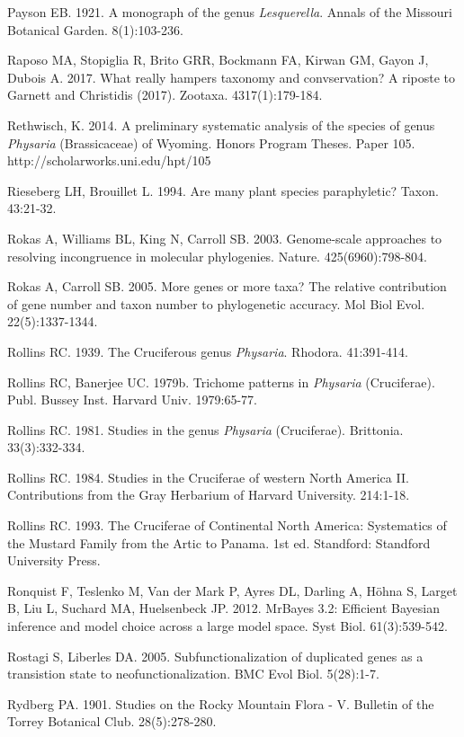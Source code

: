 Payson EB. 1921. A monograph of the genus \textit{Lesquerella}. Annals of the Missouri Botanical Garden. 8(1):103-236.

Raposo MA, Stopiglia R, Brito GRR, Bockmann FA, Kirwan GM, Gayon J, Dubois A. 2017. What really hampers taxonomy and convservation? A riposte to Garnett and Christidis (2017). Zootaxa. 4317(1):179-184.

Rethwisch, K. 2014. A preliminary systematic analysis of the species of genus \textit{Physaria} (Brassicaceae) of Wyoming. Honors Program Theses. Paper 105.
http://scholarworks.uni.edu/hpt/105

Rieseberg LH, Brouillet L. 1994. Are many plant species paraphyletic? Taxon. 43:21-32.

Rokas A, Williams BL, King N, Carroll SB. 2003. Genome-scale approaches to resolving incongruence in molecular phylogenies. Nature. 425(6960):798-804.

Rokas A, Carroll SB. 2005. More genes or more taxa? The relative contribution of gene number and taxon number to phylogenetic accuracy. Mol Biol Evol. 22(5):1337-1344.

Rollins RC. 1939. The Cruciferous genus \textit{Physaria}. Rhodora. 41:391-414.

Rollins RC, Banerjee UC. 1979b. Trichome patterns in \textit{Physaria} (Cruciferae). Publ. Bussey Inst. Harvard Univ. 1979:65-77.

Rollins RC. 1981. Studies in the genus \textit{Physaria} (Cruciferae). Brittonia. 33(3):332-334.

Rollins RC. 1984. Studies in the Cruciferae of western North America II. Contributions from the Gray Herbarium of Harvard University. 214:1-18.

Rollins RC. 1993. The Cruciferae of Continental North America: Systematics of the Mustard Family from the Artic to Panama. 1st ed. Standford: Standford University Press.

Ronquist F, Teslenko M, Van der Mark P, Ayres DL, Darling A, Höhna S, Larget B, Liu L, Suchard MA, Huelsenbeck JP. 2012. MrBayes 3.2: Efficient Bayesian inference and model choice across a large model space. Syst Biol. 61(3):539-542.

Rostagi S, Liberles DA. 2005. Subfunctionalization of duplicated genes as a transistion state to neofunctionalization. BMC Evol Biol. 5(28):1-7.

Rydberg PA. 1901. Studies on the Rocky Mountain Flora - V. Bulletin of the Torrey Botanical Club. 28(5):278-280.

